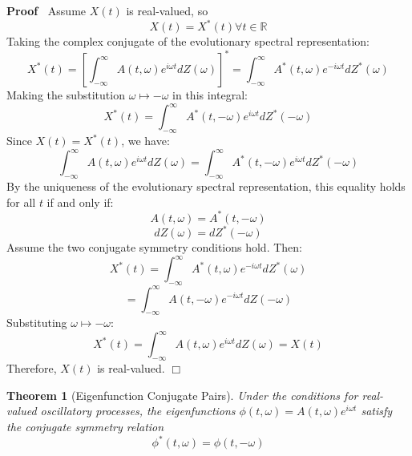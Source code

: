 \documentclass{article}
\newcommand{\tmtextbf}[1]{\text{{\bfseries{#1}}}}
\newenvironment{proof}{\noindent\textbf{Proof\ }}{\hspace*{\fill}$\Box$\medskip}
\newtheorem{theorem}{Theorem}
\begin{document}
\begin{proof}
  \tmtextbf{Necessity:} Assume $X (t)$ is real-valued, so
  \begin{equation}
    X (t) = X^{\ast} (t) \forall t \in \mathbb{R}
  \end{equation}
  Taking the complex conjugate of the evolutionary spectral representation:
  \begin{equation}
    X^{\ast} (t) = \left[ \int_{- \infty}^{\infty} A (t, \omega) e^{i \omega
    t} dZ (\omega) \right]^{\ast} = \int_{- \infty}^{\infty} A^{\ast} (t,
    \omega) e^{- i \omega t} dZ^{\ast} (\omega)
  \end{equation}
  Making the substitution $\omega \mapsto - \omega$ in this integral:
  \begin{equation}
    X^{\ast} (t) = \int_{- \infty}^{\infty} A^{\ast} (t, - \omega) e^{i \omega
    t} dZ^{\ast}  (- \omega)
  \end{equation}
  Since $X (t) = X^{\ast} (t)$, we have:
  \begin{equation}
    \int_{- \infty}^{\infty} A (t, \omega) e^{i \omega t} dZ (\omega) =
    \int_{- \infty}^{\infty} A^{\ast} (t, - \omega) e^{i \omega t} dZ^{\ast} 
    (- \omega)
  \end{equation}
  By the uniqueness of the evolutionary spectral representation, this equality
  holds for all $t$ if and only if:
  \begin{equation}
    A (t, \omega) = A^{\ast} (t, - \omega)
  \end{equation}
  \begin{equation}
    dZ (\omega) = dZ^{\ast}  (- \omega)
  \end{equation}
  \tmtextbf{Sufficiency:} Assume the two conjugate symmetry conditions hold.
  Then:
  \begin{equation}
    X^{\ast} (t) = \int_{- \infty}^{\infty} A^{\ast} (t, \omega) e^{- i \omega
    t} dZ^{\ast} (\omega)
  \end{equation}
  \begin{equation}
    = \int_{- \infty}^{\infty} A (t, - \omega) e^{- i \omega t} dZ (- \omega)
  \end{equation}
  Substituting $\omega \mapsto - \omega$:
  \[ X^{\ast} (t) = \int_{- \infty}^{\infty} A (t, \omega) e^{i \omega t} dZ
     (\omega) = X (t) \]
  Therefore, $X (t)$ is real-valued.
\end{proof}

\begin{theorem}[Eigenfunction Conjugate Pairs]
  Under the conditions for real-valued oscillatory processes, the
  eigenfunctions $\phi (t, \omega) = A (t, \omega) e^{i \omega t}$ satisfy the
  conjugate symmetry relation
  \begin{equation}
    \phi^{\ast} (t, \omega) = \phi (t, - \omega)
  \end{equation}
\end{theorem}
\end{document}
